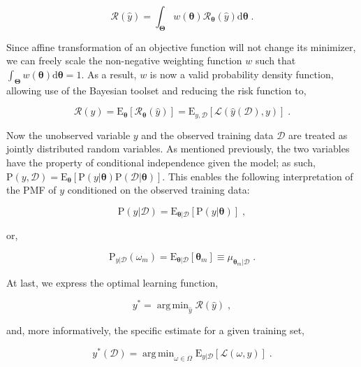 \documentclass[12pt]{article}
\DeclareMathOperator*{\argmin}{arg\,min}
\begin{document}
\begin{equation}
\mathcal{R}(\hat{y}) = \int_{\bm{\Theta}} w(\bm{\theta}) \mathcal{R}_{\bm{\theta}}(\hat{y})\mathrm{d}\bm{\theta} \;.
\end{equation}

Since affine transformation of an objective function will not change its minimizer, we can freely scale the non-negative weighting function $w$ such that $\int_{\bm{\Theta}} w(\bm{\theta}) \mathrm{d}\bm{\theta} = 1$. As a result, $w$ is now a valid probability density function, allowing use of the Bayesian toolset and reducing the risk function to,   

\begin{equation}
\mathcal{R}(\hat{y}) = \text{E}_{\bm{\theta}}\left[  \mathcal{R}_{\bm{\theta}}(\hat{y}) \right] = \text{E}_{y,\mathcal{D}}\left[ \mathcal{L}(\hat{y}(\mathcal{D}),y) \right] \;.
\end{equation}

Now the unobserved variable $y$ and the observed training data $\mathcal{D}$ are treated as jointly distributed random variables. As mentioned previously, the two variables have the property of conditional independence given the model; as such, $\text{P}(y,\mathcal{D}) = \text{E}_{\bm{\theta}} \left[ \text{P}(y | \bm{\theta}) \text{P}(\mathcal{D} | \bm{\theta}) \right]$. This enables the following interpretation of the PMF of $y$ conditioned on the observed training data:

\begin{equation}
\text{P}(y|\mathcal{D}) = \text{E}_{\bm{\theta} | \mathcal{D}} \left[ \text{P}(y|\bm{\theta}) \right] \;,
\end{equation}

or,

\begin{equation}
\text{P}_{y|\mathcal{D}}(\omega_m) = \text{E}_{\bm{\theta} | \mathcal{D}} \left[ \bm{\theta}_m \right] \equiv \mu_{\bm{\theta}_m | \mathcal{D}} \;.
\end{equation}

At last, we express the optimal learning function,

\begin{equation}
y^* = \argmin_{\hat{y}} \mathcal{R}(\hat{y}) \;,
\end{equation}

and, more informatively, the specific estimate for a given training set, 

\begin{equation}
y^*(\mathcal{D}) = \argmin_{\omega \in \Omega} \text{E}_{y|\mathcal{D}}\left[ \mathcal{L}(\omega,y) \right] \;.
\end{equation}
\end{document}
